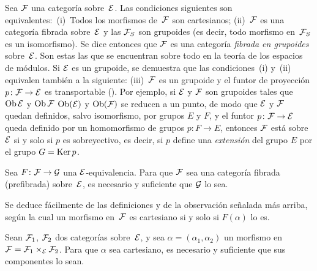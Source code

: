 \begin{remarquesstar}
Sea $\cal{F}$ una categoría sobre~$\cal{E}$. Las condiciones siguientes
son equivalentes:~(i)~Todos los morfismos de~$\cal{F}$ son cartesianos;
(ii)~$\cal{F}$ es una categoría fibrada sobre~$\cal{E}$ y las
$\cal{F}_S$ son grupoides%
(es decir, todo morfismo en~$\cal{F}_S$ es un isomorfismo). Se dice
entonces que $\cal{F}$ es una categoría \emph{fibrada en grupoides}
%
sobre~$\cal{E}$. Son estas las que se encuentran sobre todo en la
\og teoría de los espacios de módulos\fg. Si $\cal{E}$ es un grupoide, se
demuestra que las condiciones~(i) y~(ii) equivalen también a la siguiente:
(iii)~$\cal{F}$ es un grupoide y el funtor de proyección
$p\colon\cal{F}\to\cal{E}$ es transportable (\cf {}). Por
ejemplo, si $\cal{E}$ y $\cal{F}$ son grupoides tales que
{$\Ob \cal{E}$ y $\Ob \cal{F}$}
{$\Ob(\cal{E})$ y $\Ob(\cal{F})$}
se reducen a un punto, de modo que $\cal{E}$ y $\cal{F}$ quedan definidos,
salvo isomorfismo, por grupos $E$ y $F$, y el funtor
$p\colon\cal{F}\to\cal{E}$ queda definido por un homomorfismo de grupos
$p\colon F\to E$, entonces $\cal{F}$ está
sobre~$\cal{E}$ si y solo si $p$ es sobreyectivo, es decir, si $p$ define
una \emph{extensión} del grupo $E$ por el grupo $G=\Ker p$.
\end{remarquesstar}

\begin{proposition}
\label{VI.6.2}
Sea $F\colon\cal{F}\to\cal{G}$ una $\cal{E}$-equivalencia. Para que
$\cal{F}$ sea una categoría fibrada (\resp prefibrada) sobre~$\cal{E}$,
es necesario y suficiente que $\cal{G}$ lo sea.
\end{proposition}

Se deduce fácilmente de las definiciones y de la observación señalada más
arriba, según la cual un morfismo
en~$\cal{F}$ es cartesiano si y solo si $F(\alpha)$ lo es.

\begin{proposition}
\label{VI.6.3}
Sean $\cal{F}_1$, $\cal{F}_2$ dos categorías sobre~$\cal{E}$, y sea
$\alpha=(\alpha_1,\alpha_2)$ un morfismo en
$\cal{F}=\cal{F}_1\times_{\cal{E}}\cal{F}_2$. Para que $\alpha$ sea
cartesiano, es necesario y suficiente que sus componentes lo sean.
\end{proposition}

